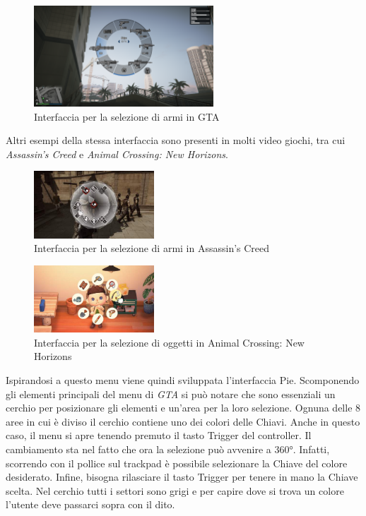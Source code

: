 \documentclass[target=bach,aauheader=]{thud}
\begin{document}
\begin{figure}[h]
    \centering
    \includegraphics[width=0.60\textwidth]{gta}
    \caption{Interfaccia per la selezione di armi in GTA}
    \label{fig:gta}
\end{figure}

Altri esempi della stessa interfaccia sono presenti in molti video giochi, tra cui \textit{Assassin's Creed} e \textit{Animal Crossing: New Horizons}.

\begin{figure}[h]
    \centering
    \includegraphics[width=0.40\textwidth]{ac}
    \caption{Interfaccia per la selezione di armi in Assassin's Creed}
    \label{fig:ac}
\end{figure}

\begin{figure}[h]
    \centering
    \includegraphics[width=0.40\textwidth]{nh}
    \caption{Interfaccia per la selezione di oggetti in Animal Crossing: New Horizons}
    \label{fig:nh}
\end{figure}

Ispirandosi a questo menu viene quindi sviluppata l'interfaccia Pie.
Scomponendo gli elementi principali del menu di \textit{GTA} si può notare che sono essenziali un cerchio per posizionare gli elementi e un'area per la loro selezione.
Ognuna delle 8 aree in cui è diviso il cerchio contiene uno dei colori delle Chiavi.
Anche in questo caso, il menu si apre tenendo premuto il tasto Trigger del controller.
Il cambiamento sta nel fatto che ora la selezione può avvenire a 360°.
Infatti, scorrendo con il pollice sul trackpad è possibile selezionare la Chiave del colore desiderato.
Infine, bisogna rilasciare il tasto Trigger per tenere in mano la Chiave scelta.
Nel cerchio tutti i settori sono grigi e per capire dove si trova un colore l'utente deve passarci sopra con il dito.
\end{document}
